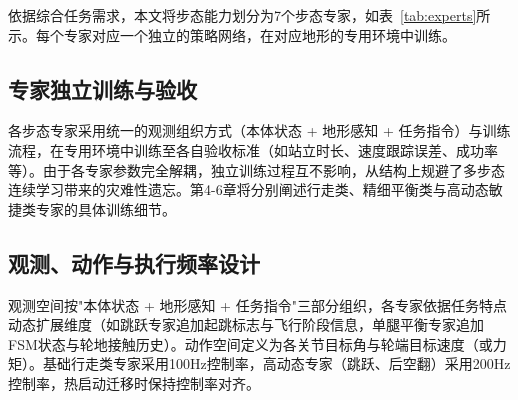 依据综合任务需求，本文将步态能力划分为7个步态专家，如表~\ref{tab:experts}所示。每个专家对应一个独立的策略网络，在对应地形的专用环境中训练。

\begin{table}[!htbp]
    \centering
    \label{tab:experts}
\end{table}

\subsection{专家独立训练与验收}

各步态专家采用统一的观测组织方式（本体状态 + 地形感知 + 任务指令）与训练流程，在专用环境中训练至各自验收标准（如站立时长、速度跟踪误差、成功率等）。由于各专家参数完全解耦，独立训练过程互不影响，从结构上规避了多步态连续学习带来的灾难性遗忘。第4-6章将分别阐述行走类、精细平衡类与高动态敏捷类专家的具体训练细节。

\subsection{观测、动作与执行频率设计}

观测空间按"本体状态 + 地形感知 + 任务指令"三部分组织，各专家依据任务特点动态扩展维度（如跳跃专家追加起跳标志与飞行阶段信息，单腿平衡专家追加FSM状态与轮地接触历史）。动作空间定义为各关节目标角与轮端目标速度（或力矩）。基础行走类专家采用100Hz控制率，高动态专家（跳跃、后空翻）采用200Hz控制率，热启动迁移时保持控制率对齐。

